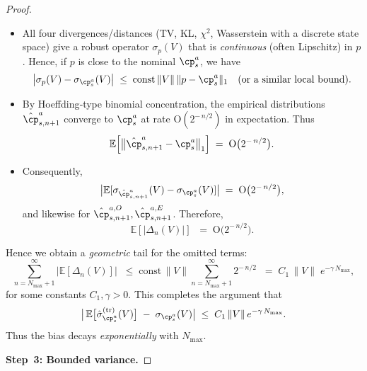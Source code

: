 \begin{proof}
\begin{itemize}
\item
All four divergences/distances (TV, KL, $\chi^2$, Wasserstein with a discrete state space) give a robust operator $\sigma_{p}(V)$ that is \emph{continuous} (often Lipschitz) in $p$.  Hence, if $p$ is close to the nominal $\cp^{a}_{s}$, we have 
\[
  \bigl|\sigma_{p}(V)-\sigma_{\cp^a_s}(V)\bigr|
  \;\le\;
  \mathrm{const}\,\|V\|
  \,\|p - \cp^a_s\|_1
  \quad(\text{or a similar local bound}).
\]
\item
By Hoeffding‐type binomial concentration, the empirical distributions $\hat{\cp}^{a}_{s,n+1}$ converge to $\cp^a_s$ at rate $\mathrm{O}(2^{-\,n/2})$ in expectation.  Thus
\[
  \mathbb{E}\Bigl[\bigl\lVert
     \hat{\cp}^{a}_{s,n+1}
     -\cp^a_s
  \bigr\rVert_1\Bigr]
  \;=\;
  \mathrm{O}\bigl(2^{-\,n/2}\bigr).
\]
\item
Consequently,
\[
  \bigl|\mathbb{E}[\sigma_{\hat{\cp}^{a}_{s,n+1}}(V)-\sigma_{\cp^a_s}(V)]\bigr|
  \;=\;
  \mathrm{O}\bigl(2^{-\,n/2}\bigr),
\]
and likewise for $\hat{\cp}^{a,O}_{s,n+1},\hat{\cp}^{a,E}_{s,n+1}$.  Therefore,
\[
  \mathbb{E}[|\Delta_n(V)|]
  \;\;=\;
  \mathrm{O}\bigl(2^{-\,n/2}\bigr).
\]
\end{itemize}

\noindent
Hence we obtain a \emph{geometric} tail for the omitted terms:
\begin{equation}
  \sum_{n=N_{\max}+1}^{\infty}\!\bigl|\mathbb{E}[\Delta_n(V)]\bigr|
  \;\;\le\;
  \mathrm{const}\,\|V\|
  \sum_{n=N_{\max}+1}^{\infty}2^{-\,n/2}
  \;\;=\;
  C_1\,\|V\|\;e^{-\gamma\,N_{\max}},
\end{equation}
for some constants $C_1,\gamma>0$.  This completes the argument that
\begin{equation}
  \bigl|\,
  \mathbb{E}\bigl[\hat{\sigma}_{\cp^a_s}^{(\mathrm{tr})}(V)\bigr]
  \;-\;
  \sigma_{\cp^a_s}(V)
  \bigr|
  \;\le\;
  C_1\,\|V\|\,
  e^{-\gamma\,N_{\max}}.
\end{equation}
Thus the bias decays \emph{exponentially} with $N_{\max}$.

\medskip
\textbf{Step~3: Bounded variance.}


\end{proof}
